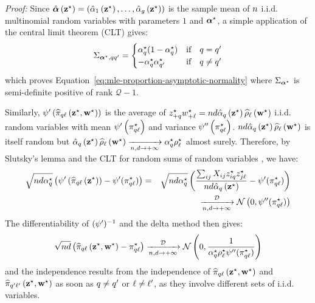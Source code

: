 \documentclass[]{imsart}
\newcommand{\1}{\mathds{1}}
\numberwithin{equation}{section}
\theoremstyle{plain}
\theoremstyle{remark}
\begin{document}
\textit{Proof:}
Since $\hat{\boldsymbol{\alpha}}\left(\mathbf{z}^\star\right) = \left(\hat{\alpha}_1\left(\mathbf{z}^\star\right), \dots, \hat{\alpha}_g\left(\mathbf{z}^\star\right)\right)$ is the sample mean of $n$ i.i.d. multinomial random variables with parameters $1$ and $\boldsymbol{\alpha}^\star$, a simple application of the central limit theorem (CLT) gives:
\begin{equation*}
  \Sigma_{\bpis, \kk \kp} =
  \begin{cases}
    \pii^{\vrai}_{\kk}(1 - \pii^{\vrai}_{\kk}) & \text{if} \quad \kk = \kp \\
    -\pii^{\vrai}_{\kk} \pii^{\vrai}_{\kp} & \text{if} \quad \kk \neq \kp \\
  \end{cases}
\end{equation*}
which proves Equation~\eqref{eq:mle-proportion-asymptotic-normality}
where $\Sigma_{\boldsymbol{\alpha}^\star}$ is
semi-definite positive of rank $\mathcal{Q} - 1$.

Similarly, $\psi'\left(\widehat{\pi}_{q\ell}\left(\mathbf{z}^\star,\mathbf{w}^\star\right)\right)$ is
the average of $z_{+q}^{\star}w_{+\ell}^{\star} =
nd\hat{\alpha}_q\left(\mathbf{z}^\star\right)\widehat{\rho}_\ell\left(\mathbf{w}^\star\right)$
i.i.d. random variables with mean
$\psi'\left(\pi^\star_{q\ell}\right)$ and variance
$\psi''\left(\pi^\star_{q\ell}\right)$. $nd\hat{\alpha}_q\left(\mathbf{z}^\star\right)\widehat{\rho}_\ell\left(\mathbf{w}^\star\right)$
is itself random but
\mbox{$\hat{\alpha}_q\left(\mathbf{z}^\star\right)\widehat{\rho}_\ell\left(\mathbf{w}^\star\right)
  \xrightarrow[n,d \to +\infty]{} \alpha^\star_{q}
  \rho^\star_{\ell}$} almost surely. Therefore, by Slutsky's lemma and
the CLT for random sums of random variables \cite{Shanthikumar1984}, we have:
\begin{eqnarray*}
\sqrt{\n\dd\pii^\star_{\kk}} \left(\normp\left(\hal_{\kk\el}\left(\bzs\right)\right) - \normp(\al^\vrai_{\kk\el}) \right)  &=& \sqrt{\n\dd\pii^\star_{\kk}} \left( \frac{\sum_{\ii\jj} \Xij \zik^{\vrai} \zjl^{\vrai}}{nd\hpi_\kk\left(\bzs\right)} - \normp(\al^\vrai_{\kk\el}) \right) \\
&& \xrightarrow[\n,\dd \to +\infty]{\mathcal{D}} \mcN\left(0, \normp'(\al^\vrai_{\kk\el})\right)
\end{eqnarray*}
The differentiability of $(\psi')^{-1}$ and the delta method then gives:
\begin{equation*}
  \sqrt{\n\dd} \left(\hal_{\kk\el}\left(\bzs,\bws\right) - \al^\vrai_{\kk\el} \right) \xrightarrow[\n,\dd \to +\infty]{\mathcal{D}} \mcN\left(0, \frac{1}{\pii^\star_{\kk}\rhoo^\star_{\el} \normp'(\al^\vrai_{\kk\el})}\right)
\end{equation*}
and the independence results from the independence of $\widehat{\pi}_{q\ell}\left(\mathbf{z}^\star,\mathbf{w}^\star\right)$ and
$\widehat{\pi}_{q'\ell'}\left(\mathbf{z}^\star,\mathbf{w}^\star\right)$ as soon as $q \neq q'$ or $\ell
\neq \ell'$, as they involve different sets of i.i.d. variables.
\end{document}
